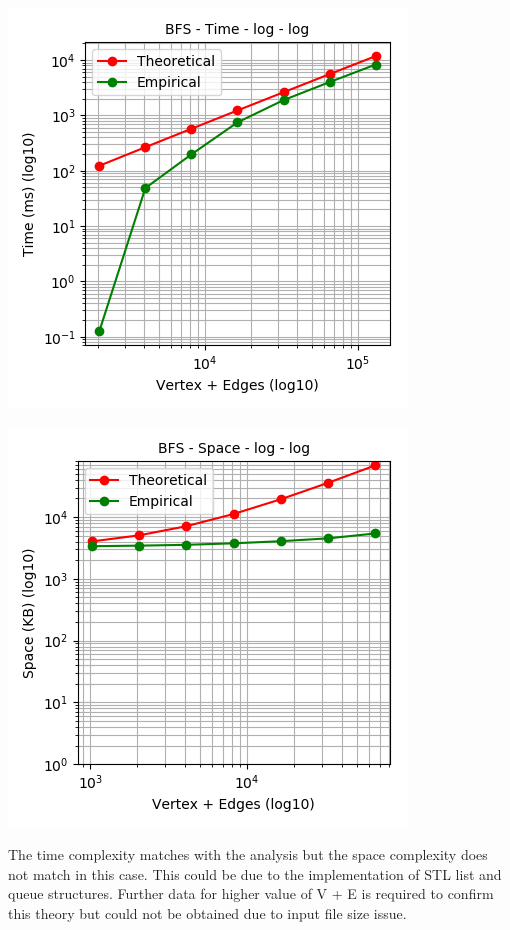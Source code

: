 \documentclass[11pt,a4paper,oneside]{article}
\begin{document}
    \begin{center}
    	\includegraphics[scale=0.6]{7.png}		
    \end{center}

    \begin{center}
    	\includegraphics[scale=0.6]{8.png}		
    \end{center}

   The time complexity matches with the analysis but the space complexity does not match in this case. This could be due to the implementation of STL list and queue structures. Further data for higher value of V + E is required to confirm this theory but could not be obtained due to input file size issue.
\end{document}
